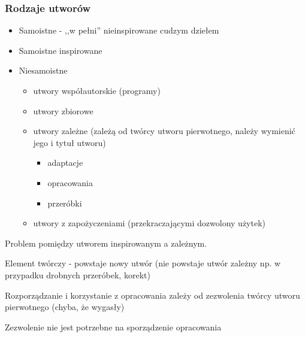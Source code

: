 \documentclass[12pt,a4paper]{article}
\begin{document}
\subsubsection{Rodzaje utworów}
\begin{itemize}
\item Samoistne - ,,w pełni'' nieinspirowane cudzym dziełem
\item Samoistne inspirowane
\item Niesamoistne
	\begin{itemize}
		\item utwory współautorskie (programy)
		\item utwory zbiorowe
		\item utwory zależne (zależą od twórcy utworu pierwotnego, należy wymienić jego i tytuł utworu)
			\begin{itemize}
				\item adaptacje
				\item opracowania
				\item przeróbki
			\end{itemize}
		\item utwory z zapożyczeniami (przekraczającymi dozwolony użytek) 
	\end{itemize}
\end{itemize}

Problem pomiędzy utworem inspirowanym a zależnym.

Element twórczy - powstaje nowy utwór (nie powstaje utwór zależny np. w przypadku drobnych przeróbek, korekt)

Rozporządzanie i korzystanie z opracowania zależy od zezwolenia twórcy utworu pierwotnego (chyba, że wygasły)

Zezwolenie nie jest potrzebne na sporządzenie opracowania
\end{document}
